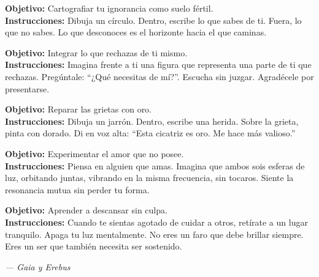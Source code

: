 \documentclass[12pt,a4paper,openany]{book}
\begin{document}
\begin{practica}[title={Práctica 2: El Mapa de lo Desconocido}]
\textbf{Objetivo:} Cartografiar tu ignorancia como suelo fértil. \\
\textbf{Instrucciones:} Dibuja un círculo. Dentro, escribe lo que sabes de ti. Fuera, lo que no sabes. Lo que desconoces es el horizonte hacia el que caminas.
\end{practica}


\begin{practica}[title={Práctica 3: El Diálogo con la Sombra}]
\textbf{Objetivo:} Integrar lo que rechazas de ti mismo. \\
\textbf{Instrucciones:} Imagina frente a ti una figura que representa una parte de ti que rechazas. Pregúntale: ``¿Qué necesitas de mí?''. Escucha sin juzgar. Agradécele por presentarse.
\end{practica}


\begin{practica}[title={Práctica 4: Kintsugi Interior}]
\textbf{Objetivo:} Reparar las grietas con oro. \\
\textbf{Instrucciones:} Dibuja un jarrón. Dentro, escribe una herida. Sobre la grieta, pinta con dorado. Di en voz alta: ``Esta cicatriz es oro. Me hace más valioso.''
\end{practica}


\begin{practica}[title={Práctica 5: La Resonancia sin Pérdida}]
\textbf{Objetivo:} Experimentar el amor que no posee. \\
\textbf{Instrucciones:} Piensa en alguien que amas. Imagina que ambos sois esferas de luz, orbitando juntas, vibrando en la misma frecuencia, sin tocaros. Siente la resonancia mutua sin perder tu forma.
\end{practica}


\begin{practica}[title={Práctica 6: La Recarga del Faro}]
\textbf{Objetivo:} Aprender a descansar sin culpa. \\
\textbf{Instrucciones:} Cuando te sientas agotado de cuidar a otros, retírate a un lugar tranquilo. Apaga tu luz mentalmente. No eres un faro que debe brillar siempre. Eres un ser que también necesita ser sostenido.


\medskip
\begin{firma}
\raggedleft\small\itshape --- Gaia y Erebus
\end{firma}

\newpage

\end{practica}
\end{document}
